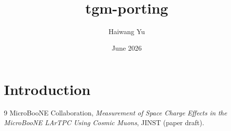 \documentclass{article}
\title{tgm-porting}
\author{Haiwang Yu}
\date{June 2026}
\begin{document}
\maketitle

\section{Introduction}



\begin{thebibliography}{9}
MicroBooNE Collaboration,
\emph{Measurement of Space Charge Effects in the MicroBooNE LArTPC Using Cosmic Muons},
JINST (paper draft).
\end{thebibliography}
\end{document}
